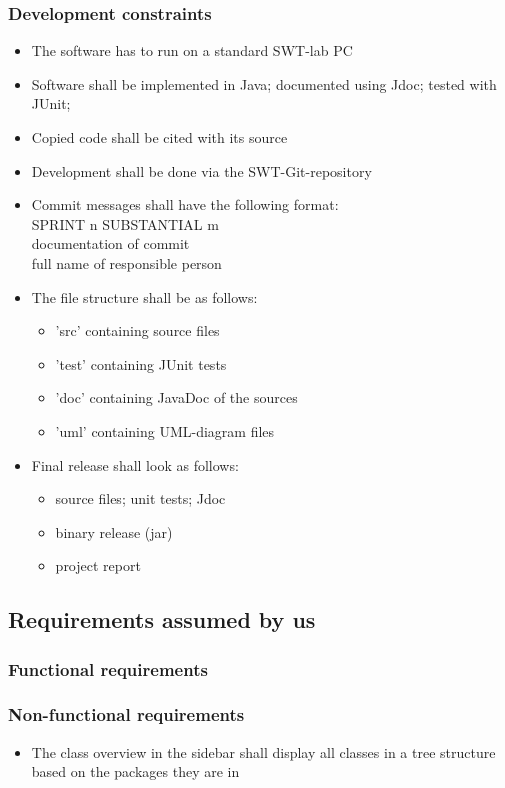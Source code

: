 \subsubsection{Development constraints}
\begin{itemize}
	\item The software has to run on a standard SWT-lab PC
	\item Software shall be implemented in Java; documented using Jdoc; tested with JUnit;
	\item Copied code shall be cited with its source
	\item Development shall be done via the SWT-Git-repository
	\item Commit messages shall have the following format: \\
	SPRINT n SUBSTANTIAL m \\
	documentation of commit \\
	full name of responsible person
	\item The file structure shall be as follows:
	\begin{itemize}
		\item 'src' containing source files
		\item 'test' containing JUnit tests
		\item 'doc' containing JavaDoc of the sources
		\item 'uml' containing UML-diagram files
	\end{itemize}
	\item Final release shall look as follows:
	\begin{itemize}
		\item source files; unit tests; Jdoc
		\item binary release (jar)
		\item project report
	\end{itemize}
	
\end{itemize}
\subsection{Requirements assumed by us}
\subsubsection{Functional requirements}

\subsubsection{Non-functional requirements}
\begin{itemize}
\item The class overview in the sidebar shall display all classes in a tree structure based on the packages they are in
\end{itemize}
